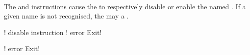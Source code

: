  \\

The  and  instructions cause the  to respectively disable or enable the named . If a given name is not recognised, the  may  a . \\

\begin{examples}
\begin{examplesource}
! disable instruction
! error Exit!
\end{examplesource}
  \begin{exampleoutput}
    ! error Exit!
  \end{exampleoutput}
\end{examples}

